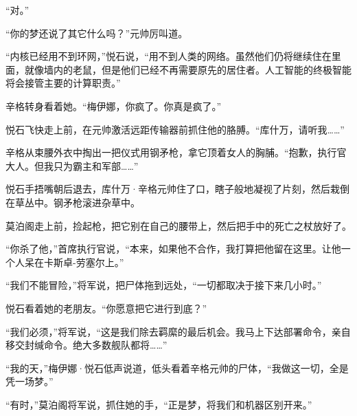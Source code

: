 \documentclass[AutoFakeBold=true]{book}
\begin{document}
``对。''

``你的梦还说了其它什么吗？''元帅厉叫道。

``内核已经用不到环网，''悦石说，``用不到人类的网络。虽然他们仍将继续住在里面，就像墙内的老鼠，但是他们已经不再需要原先的居住者。人工智能的终极智能将会接管主要的计算职责。''

辛格转身看着她。``梅伊娜，你疯了。你真是疯了。''

悦石飞快走上前，在元帅激活远距传输器前抓住他的胳膊。``库什万，请听我……''

辛格从束腰外衣中掏出一把仪式用钢矛枪，拿它顶着女人的胸脯。``抱歉，执行官大人。但我只为霸主和军部……''

悦石手捂嘴朝后退去，库什万·辛格元帅住了口，瞎子般地凝视了片刻，然后栽倒在草丛中。钢矛枪滚进杂草中。

莫泊阁走上前，捡起枪，把它别在自己的腰带上，然后把手中的死亡之杖放好了。

``你杀了他，''首席执行官说，``本来，如果他不合作，我打算把他留在这里。让他一个人呆在卡斯卓-劳塞尔上。''

``我们不能冒险，''将军说，把尸体拖到远处，``一切都取决于接下来几小时。''

悦石看着她的老朋友。``你愿意把它进行到底？''

``我们必须，''将军说，``这是我们除去羁縻的最后机会。我马上下达部署命令，亲自移交封缄命令。绝大多数舰队都将……''

``我的天，''梅伊娜·悦石低声说道，低头看着辛格元帅的尸体，``我做这一切，全是凭一场梦。''

``有时，''莫泊阁将军说，抓住她的手，``正是梦，将我们和机器区别开来。''

\chapter{}
\end{document}
